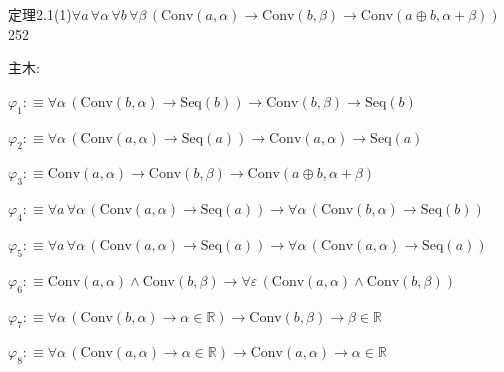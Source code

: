 \begin{fullproof}{定理2.1(1)}{$\forall a\,\forall \alpha\,\forall b\,\forall \beta\,(\mathrm{Conv}(a,\alpha) \to \mathrm{Conv}(b,\beta) \to \mathrm{Conv}(a \oplus b,\alpha + \beta))$}{252}
\begin{ptree}
\end{ptree}
\noindent 主木:
\begin{ptree}
\noLine
{}
\noLine
{}
\noLine
{}
\noLine
{}
\end{ptree}
\begin{abbrevlist}
\item $\varphi_{1} :\equiv \forall \alpha\,(\mathrm{Conv}(b,\alpha) \to \mathrm{Seq}(b)) \to \mathrm{Conv}(b,\beta) \to \mathrm{Seq}(b)$
\item $\varphi_{2} :\equiv \forall \alpha\,(\mathrm{Conv}(a,\alpha) \to \mathrm{Seq}(a)) \to \mathrm{Conv}(a,\alpha) \to \mathrm{Seq}(a)$
\item $\varphi_{3} :\equiv \mathrm{Conv}(a,\alpha) \to \mathrm{Conv}(b,\beta) \to \mathrm{Conv}(a \oplus b,\alpha + \beta)$
\item $\varphi_{4} :\equiv \forall a\,\forall \alpha\,(\mathrm{Conv}(a,\alpha) \to \mathrm{Seq}(a)) \to \forall \alpha\,(\mathrm{Conv}(b,\alpha) \to \mathrm{Seq}(b))$
\item $\varphi_{5} :\equiv \forall a\,\forall \alpha\,(\mathrm{Conv}(a,\alpha) \to \mathrm{Seq}(a)) \to \forall \alpha\,(\mathrm{Conv}(a,\alpha) \to \mathrm{Seq}(a))$
\item $\varphi_{6} :\equiv \mathrm{Conv}(a,\alpha) \land \mathrm{Conv}(b,\beta) \to \forall \varepsilon\,(\mathrm{Conv}(a,\alpha) \land \mathrm{Conv}(b,\beta))$
\item $\varphi_{7} :\equiv \forall \alpha\,(\mathrm{Conv}(b,\alpha) \to \alpha \in \mathbb{R}) \to \mathrm{Conv}(b,\beta) \to \beta \in \mathbb{R}$
\item $\varphi_{8} :\equiv \forall \alpha\,(\mathrm{Conv}(a,\alpha) \to \alpha \in \mathbb{R}) \to \mathrm{Conv}(a,\alpha) \to \alpha \in \mathbb{R}$

\end{abbrevlist}
\end{fullproof}
